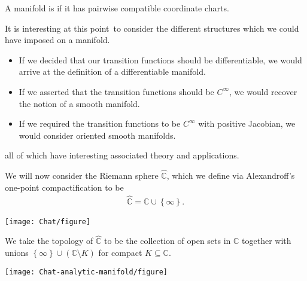 \begin{definition}
	A manifold is  if it has pairwise compatible coordinate charts.
\end{definition}

\begin{remark}
	It is interesting at this point\sidenotemark\ to consider the different
	structures which we could have imposed on a manifold.
	\begin{itemize}
		\item If we decided that our transition functions should be differentiable, we
		      would arrive at the definition of a differentiable manifold.
		\item If we asserted that the transition functions should be $ C ^{\infty} $,
		      we would recover the notion of a smooth manifold.
		\item If we required the transition functions to be $ C ^{\infty} $ with
		      positive Jacobian, we would consider oriented smooth manifolds.
	\end{itemize}
	all of which have interesting associated theory and applications.
\end{remark}

We will now consider the Riemann sphere $ \hat{\mathbb{C}} $, which we define
via Alexandroff's one-point
compactification to be
\begin{align*}
	\hat{\mathbb{C}} = \mathbb{C} \cup \left\{ \infty \right\}.
\end{align*}

\begin{marginfigure}[-15\baselineskip]
	\centering
	\texttt{[image: Chat/figure]}
	\caption{$ \hat{\mathbb{C}}\cong S^2$}
\end{marginfigure}

We take the topology of $ \hat{\mathbb{C}} $ to be the collection of open sets
in $ \mathbb{C} $ together with unions $ \left\{ \infty \right\}\cup \left(
	\mathbb{C}\setminus K \right) $ for compact $ K \subseteq \mathbb{C}$.

\begin{marginfigure}
	\centering
	\texttt{[image: Chat-analytic-manifold/figure]}
	\caption{$ \hat{\mathbb{C}} = U_0 \cup U _{\infty} $}
\end{marginfigure}

